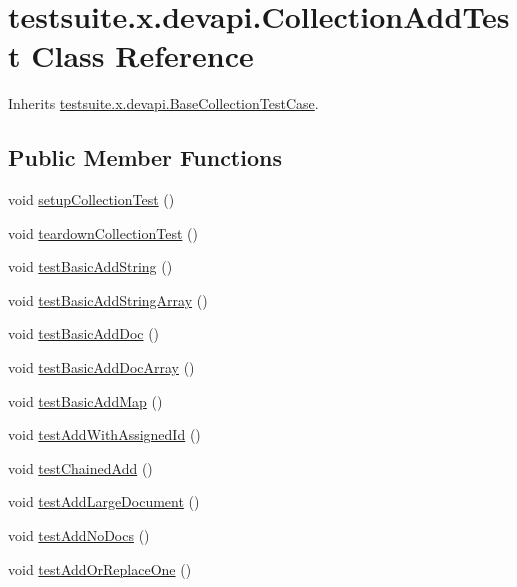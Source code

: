 \hypertarget{classtestsuite_1_1x_1_1devapi_1_1_collection_add_test}{}\section{testsuite.\+x.\+devapi.\+Collection\+Add\+Test Class Reference}
\label{classtestsuite_1_1x_1_1devapi_1_1_collection_add_test}


Inherits \mbox{\hyperlink{classtestsuite_1_1x_1_1devapi_1_1_base_collection_test_case}{testsuite.\+x.\+devapi.\+Base\+Collection\+Test\+Case}}.

\subsection*{Public Member Functions}
\begin{DoxyCompactItemize}
\item 
void \mbox{\hyperlink{classtestsuite_1_1x_1_1devapi_1_1_collection_add_test_a2022cf17e697464a2fec88b3792e9f85}{setup\+Collection\+Test}} ()
\item 
void \mbox{\hyperlink{classtestsuite_1_1x_1_1devapi_1_1_collection_add_test_a796224d5412d63b537d37819199a1c6f}{teardown\+Collection\+Test}} ()
\item 
void \mbox{\hyperlink{classtestsuite_1_1x_1_1devapi_1_1_collection_add_test_aecf4028f1eed61e60d18bc3e0edd6e41}{test\+Basic\+Add\+String}} ()
\item 
void \mbox{\hyperlink{classtestsuite_1_1x_1_1devapi_1_1_collection_add_test_abe5e375460cf9b421c3820607092c7c1}{test\+Basic\+Add\+String\+Array}} ()
\item 
void \mbox{\hyperlink{classtestsuite_1_1x_1_1devapi_1_1_collection_add_test_a46a68e43c37878cf175e5f9923fd55b1}{test\+Basic\+Add\+Doc}} ()
\item 
void \mbox{\hyperlink{classtestsuite_1_1x_1_1devapi_1_1_collection_add_test_a82e5bba6468babfbd05801196009565c}{test\+Basic\+Add\+Doc\+Array}} ()
\item 
void \mbox{\hyperlink{classtestsuite_1_1x_1_1devapi_1_1_collection_add_test_ad7332e54a1c09366697b719475c20621}{test\+Basic\+Add\+Map}} ()
\item 
void \mbox{\hyperlink{classtestsuite_1_1x_1_1devapi_1_1_collection_add_test_a1d5c77b4846ccdfc9213b88a1c45f07b}{test\+Add\+With\+Assigned\+Id}} ()
\item 
void \mbox{\hyperlink{classtestsuite_1_1x_1_1devapi_1_1_collection_add_test_a764db5017b89c77250620aae36e1a21e}{test\+Chained\+Add}} ()
\item 
void \mbox{\hyperlink{classtestsuite_1_1x_1_1devapi_1_1_collection_add_test_afb18571ef5e4519aead82658bdb740d2}{test\+Add\+Large\+Document}} ()
\item 
void \mbox{\hyperlink{classtestsuite_1_1x_1_1devapi_1_1_collection_add_test_a73fd3448e76d09a9b254a5e699b9cd6d}{test\+Add\+No\+Docs}} ()
\item 
void \mbox{\hyperlink{classtestsuite_1_1x_1_1devapi_1_1_collection_add_test_ae06c318a2df37207be739448fc47634e}{test\+Add\+Or\+Replace\+One}} ()
\end{DoxyCompactItemize}
